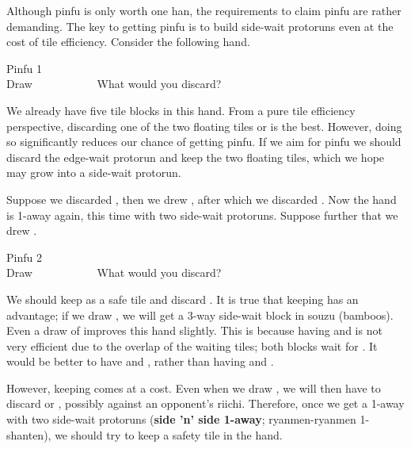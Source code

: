 Although {\jap pinfu} is only worth one {\jap han}, the requirements to claim {\jap pinfu} are rather demanding. The key to getting {\jap pinfu} is to build side-wait protoruns even at the cost of tile efficiency. Consider the following hand. 
\begin{itembox}[r]{{\jap Pinfu} 1}
\bp
{}~\\
\hfill\footnotesize{Draw~~~~~~~~~~~}
\ep
\vspace{-17pt}What would you discard? \vspace{-5pt}
\end{itembox}
\noindent
We already have five tile blocks in this hand. From a pure tile efficiency perspective, discarding one of the two floating tiles {\LARGE{}} or {\LARGE{}} is the best. However, doing so significantly reduces our chance of getting {\jap pinfu}. If we aim for {\jap pinfu} we should discard the edge-wait protorun {\LARGE{}} and keep the two floating tiles, which we hope may grow into a side-wait protorun. 

\bigskip
Suppose we discarded {\LARGE{}}, then we drew {\LARGE{}}, after which we discarded {\LARGE{}}. Now the hand is 1-away again, this time with two side-wait protoruns. Suppose further that we drew {\LARGE\xi}. 
\begin{itembox}[r]{{\jap Pinfu} 2}
\bp
{}~\xi\\
\hfill\footnotesize{Draw~~~~~~~~~~~}
\ep
\vspace{-17pt}What would you discard? \vspace{-5pt}
\end{itembox}
\noindent
We should keep {\LARGE\xi} as a safe tile and discard {\LARGE{}}. It is true that keeping {\LARGE{}} has an advantage; if we draw {\LARGE{}}, we will get a 3-way side-wait block in {\jap souzu} (bamboos). Even a draw of {\LARGE{}} improves this hand slightly. This is because having {\LARGE{}} and {\LARGE{}} is not very efficient due to the overlap of the waiting tiles; both blocks wait for {\LARGE{}}. It would be better to have {\LARGE{}} and {\LARGE{}}, rather than having {\LARGE{}} and {\LARGE{}}.

\bigskip
However, keeping {\LARGE{}} comes at a cost. Even when we draw {\LARGE{}}, we will then have to discard {\LARGE{}} or {\LARGE{}}, possibly against an opponent's riichi. 
Therefore, once we get a 1-away with two side-wait protoruns ({\bf side 'n' side 1-away}; {\jap ryanmen-ryanmen 1-shanten}), we should try to keep a safety tile in the hand.


